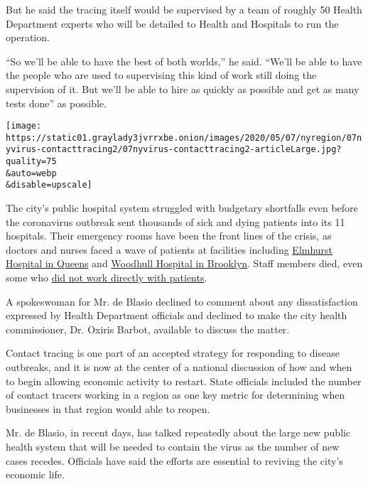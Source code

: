 But he said the tracing itself would be supervised by a team of roughly
50 Health Department experts who will be detailed to Health and
Hospitals to run the operation.

``So we'll be able to have the best of both worlds,'' he said. ``We'll
be able to have the people who are used to supervising this kind of work
still doing the supervision of it. But we'll be able to hire as quickly
as possible and get as many tests done'' as possible.

\texttt{[image: https://static01.graylady3jvrrxbe.onion/images/2020/05/07/nyregion/07nyvirus-contacttracing2/07nyvirus-contacttracing2-articleLarge.jpg?quality=75\\\&auto=webp\\\&disable=upscale]}

The city's public hospital system struggled with budgetary shortfalls
even before the coronavirus outbreak sent thousands of sick and dying
patients into its 11 hospitals. Their emergency rooms have been the
front lines of the crisis, as doctors and nurses faced a wave of
patients at facilities including
\href{https://www.nytimes3xbfgragh.onion/2020/03/25/nyregion/nyc-coronavirus-hospitals.html}{Elmhurst
Hospital in Queens} and
\href{https://www.nytimes3xbfgragh.onion/2020/04/15/nyregion/coronavirus-woodhull-madhvi-aya-dead.html}{Woodhull
Hospital in Brooklyn}. Staff members died, even some who
\href{https://www.nytimes3xbfgragh.onion/2020/05/04/nyregion/coronavirus-ny-hospital-workers.html}{did
not work directly with patients}.

A spokeswoman for Mr. de Blasio declined to comment about any
dissatisfaction expressed by Health Department officials and declined to
make the city health commissioner, Dr. Oxiris Barbot, available to
discuss the matter.

Contact tracing is one part of an accepted strategy for responding to
disease outbreaks, and it is now at the center of a national discussion
of how and when to begin allowing economic activity to restart. State
officials included the number of contact tracers working in a region as
one key metric for determining when businesses in that region would able
to reopen.

Mr. de Blasio, in recent days, has talked repeatedly about the large new
public health system that will be needed to contain the virus as the
number of new cases recedes. Officials have said the efforts are
essential to reviving the city's economic life.

\href{https://www.nytimes3xbfgragh.onion/news-event/coronavirus?action=click\&pgtype=Article\&state=default\&region=MAIN_CONTENT_3\&context=storylines_faq}{}

